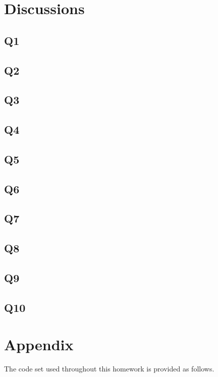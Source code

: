 \documentclass{assignment}
\begin{document}
\section{Discussions}
\subsection{Q1}

\subsection{Q2}

\subsection{Q3}

\subsection{Q4}

\subsection{Q5}

\subsection{Q6}

\subsection{Q7}

\subsection{Q8}

\subsection{Q9}

\subsection{Q10}

\section*{Appendix}
The code set used throughout this homework is provided as follows. 

% 



\nocite{*} 
\end{document}

